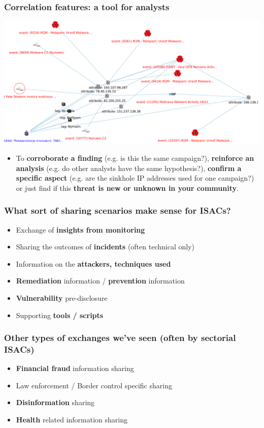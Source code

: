 \begin{frame}
        \frametitle{Correlation features: a tool for analysts}
        \includegraphics[scale=0.18]{campaign.png}
        \begin{itemize}
                \item To {\bf corroborate a finding} (e.g. is this the same campaign?), {\bf reinforce an analysis} (e.g. do other analysts have the same hypothesis?), {\bf confirm a specific aspect} (e.g. are the sinkhole IP addresses used for one campaign?) or just find if this {\bf threat is new or unknown in your community}.
        \end{itemize}
\end{frame}


\begin{frame}
\frametitle{What sort of sharing scenarios make sense for ISACs?}
    \begin{itemize}
        \item Exchange of {\bf insights from monitoring}
        \item Sharing the outcomes of {\bf incidents} (often technical only)
        \item Information on the {\bf attackers, techniques used}
        \item {\bf Remediation} information / {\bf prevention} information
        \item {\bf Vulnerability} pre-disclosure
        \item Supporting {\bf tools / scripts}
    \end{itemize}
\end{frame}

\begin{frame}
\frametitle{Other types of exchanges we've seen (often by sectorial ISACs)}
    \begin{itemize}
        \item {\bf Financial fraud} information sharing
        \item Law enforcement / Border control specific sharing
        \item {\bf Disinformation} sharing
        \item {\bf Health} related information sharing
    \end{itemize}
\end{frame}

